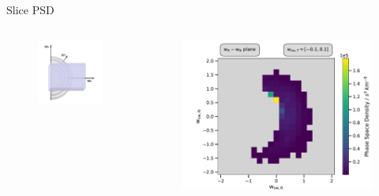 \documentclass{beamer}
\begin{document}
\begin{frame}{Slice PSD}
\begin{columns}
	\column{3cm}
	\begin{figure}
		\includegraphics[scale=.7]{Pics/slice_T2.pdf}
	\end{figure}
	\column{6.5cm}
	\begin{figure}
		\includegraphics[scale=.45]{Pics/slice_psd_T.pdf}
	\end{figure}
\column{.5cm}
\end{columns}
\end{frame}
\end{document}
